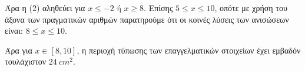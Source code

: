 \begin{alist}
\begin{center}
\end{center}

Άρα η (2) αληθεύει για $x \le -2 \text{ ή } x \ge 8$. Επίσης $5 \le x \le 10$, οπότε με χρήση του άξονα των πραγματικών αριθμών παρατηρούμε ότι οι κοινές λύσεις των ανισώσεων είναι:
$8 \le x \le 10$.

Άρα για $x \in [8, 10]$, η περιοχή τύπωσης των επαγγελματικών στοιχείων έχει εμβαδόν τουλάχιστον $\SI{24}{cm^2}$.
\end{alist}

